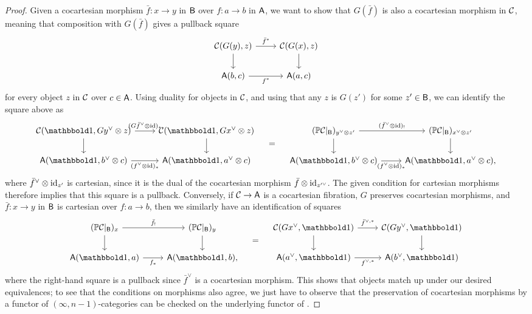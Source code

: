 \documentclass[a4paper,11pt]{article}
\begin{document}
\begin{proof}
  Given a cocartesian morphism $\bar{f} \colon x \to y$ in $\textup{\textsf{B}}$ over
  $f \colon a \to b$ in $\textup{\textsf{A}}$, we want to show that $G(\bar{f})$ is
  also a cocartesian morphism in $\mathcal{C}$, meaning that composition with
  $G(\bar{f})$ gives a pullback square
  \[
    \begin{tikzcd}
      \nC(G(y),z) \ar[r, "\bar{f}^{*}"] \ar[d] & \nC(G(x),z)  \ar[d] \\
     \oA(b,c) \ar[r, "f^{*}"'] & \oA(a,c)
    \end{tikzcd}
  \]
  for every object $z$ in $\mathcal{C}$ over $c \in \textup{\textsf{A}}$. Using duality for
  objects in $\mathcal{C}$, and using that any $z$ is $G(z')$ for some $z' \in
  \textup{\textsf{B}}$, we can identify the square above as
  \[
    \begin{tikzcd}
      \nC(\bbone,Gy^{\vee} \otimes z) \ar[r, "(G\bar{f}^{\vee} \otimes
      \id)_{*}"] \ar[d] & \nC(\bbone,Gx^{\vee} \otimes z)  \ar[d] \\
     \oA(\bbone,b^{\vee}\otimes c) \ar[r, "(f^{\vee} \otimes
     \id)_{*}"'] & \oA(\bbone,a^{\vee} \otimes c)
   \end{tikzcd}
   \quad = \quad
    \begin{tikzcd}
      (\mP\nC|_{\oB})_{y^{\vee} \otimes z'} \ar[r, "(\bar{f}^{\vee} \otimes
      \id)_{!}"] \ar[d] & (\mP\nC|_{\oB})_{x^{\vee} \otimes z'}  \ar[d] \\
     \oA(\bbone,b^{\vee}\otimes c) \ar[r, "(f^{\vee} \otimes
     \id)_{*}"'] & \oA(\bbone,a^{\vee} \otimes c),
   \end{tikzcd}
  \]
  where $\bar{f}^{\vee} \otimes \text{\textup{id}}_{z'}$ is cartesian, since it is the
  dual of the cocartesian morphism $\bar{f}
  \otimes\text{\textup{id}}_{z'^{\vee}}$. The given condition for cartesian morphisms
  therefore implies that this square is a pullback. Conversely, if
  $\nC \to \oA$ is a cocartesian fibration, $G$ preserves cocartesian
  morphisms, and $\bar{f} \colon x \to
  y$ in $\textup{\textsf{B}}$ is cartesian over $f \colon a \to b$, then we similarly
  have an identification of squares
  \[
    \begin{tikzcd}
      (\mP\nC|_{\oB})_{x} \ar[r, "\bar{f}_{!}"] \ar[d] & (\mP\nC|_{\oB})_{y}  \ar[d] \\
     \oA(\bbone,a) \ar[r, "f_{*}"'] & \oA(\bbone, b),
   \end{tikzcd}
   \quad = \quad
    \begin{tikzcd}
      \nC(Gx^{\vee},\bbone) \ar[r, "\bar{f}^{\vee,*}"] \ar[d] & \nC(Gy^{\vee},\bbone)  \ar[d] \\
     \oA(a^{\vee},\bbone) \ar[r, "f^{\vee,*}"'] & \oA(b^{\vee},\bbone)
    \end{tikzcd}   
  \]
  where the right-hand square is a pullback since $\bar{f}^{\vee}$ is a
  cocartesian morphism.  This shows that objects match up under our
  desired equivalences; to see that the conditions on morphisms also agree, we
  just have to observe that the preservation of cocartesian morphisms
  by a functor of $(\infty,n-1)$-categories can be checked on the
  underlying functor of \icats{}.
\end{proof}
\end{document}

